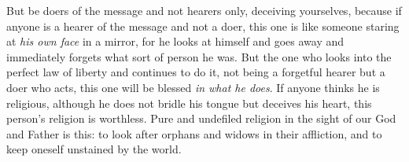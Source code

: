 \begin{biblechapter}
\verse But be doers of the message and not hearers only, deceiving yourselves,
\verse because if anyone is a hearer of the message and not a doer, this one is like someone staring at \textit{his own face} in a mirror,
\verse for he looks at himself and goes away and immediately forgets what sort of person he was.
\verse But the one who looks into the perfect law of liberty and continues to do it, not being a forgetful hearer but a doer who acts, this one will be blessed \textit{in what he does}.
\verse If anyone thinks he is religious, although he does not bridle his tongue but deceives his heart, this person’s religion is worthless.
\verse Pure and undefiled religion in the sight of our God and Father is this: to look after orphans and widows in their affliction, and to keep oneself unstained by the world.
\end{biblechapter}

